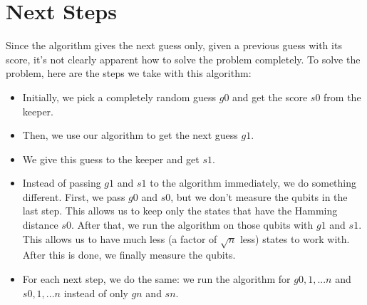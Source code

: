%
\section{Next Steps}
%

Since the algorithm gives the next guess only, given a previous guess with its score, it's not clearly apparent how to solve the problem completely. To solve the problem, here are the steps we take with this algorithm:

\begin{itemize}
    \item Initially, we pick a completely random guess $g0$ and get the score $s0$ from the keeper.
    \item Then, we use our algorithm to get the next guess $g1$.
    \item We give this guess to the keeper and get $s1$.
    \item Instead of passing $g1$ and $s1$ to the algorithm immediately, we do something different. First, we pass $g0$ and $s0$, but we don't measure the qubits in the last step. This allows us to keep only the states that have the Hamming distance $s0$. After that, we run the algorithm on those qubits with $g1$ and $s1$. This allows us to have much less (a factor of $\sqrt{n}$ less) states to work with. After this is done, we finally measure the qubits.
    \item For each next step, we do the same: we run the algorithm for $g0,1,...n$ and $s0,1,...n$ instead of only $gn$ and $sn$.
\end{itemize}